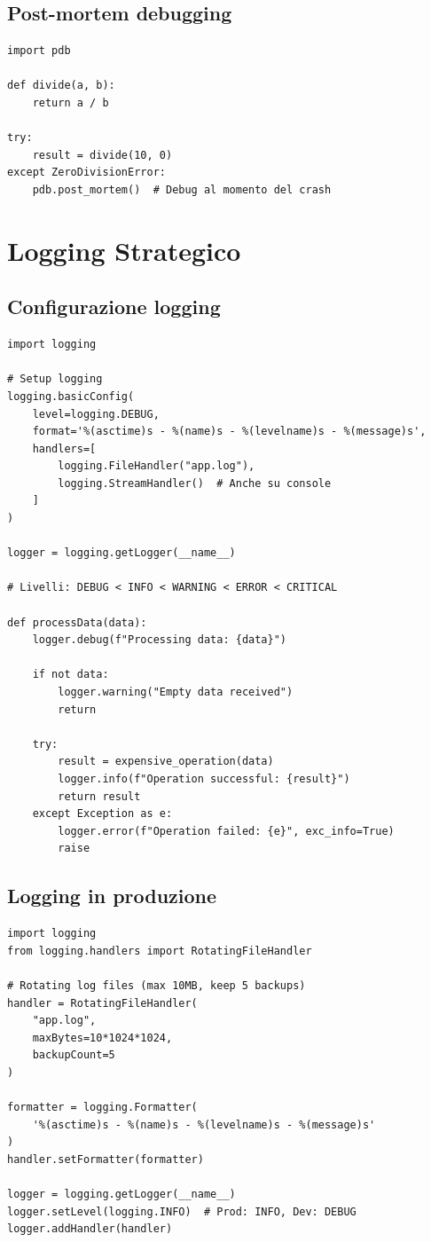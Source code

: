 \subsection{Post-mortem debugging}

\begin{lstlisting}
import pdb

def divide(a, b):
    return a / b

try:
    result = divide(10, 0)
except ZeroDivisionError:
    pdb.post_mortem()  # Debug al momento del crash
\end{lstlisting}

\section{Logging Strategico}

\subsection{Configurazione logging}

\begin{lstlisting}
import logging

# Setup logging
logging.basicConfig(
    level=logging.DEBUG,
    format='%(asctime)s - %(name)s - %(levelname)s - %(message)s',
    handlers=[
        logging.FileHandler("app.log"),
        logging.StreamHandler()  # Anche su console
    ]
)

logger = logging.getLogger(__name__)

# Livelli: DEBUG < INFO < WARNING < ERROR < CRITICAL

def processData(data):
    logger.debug(f"Processing data: {data}")

    if not data:
        logger.warning("Empty data received")
        return

    try:
        result = expensive_operation(data)
        logger.info(f"Operation successful: {result}")
        return result
    except Exception as e:
        logger.error(f"Operation failed: {e}", exc_info=True)
        raise
\end{lstlisting}

\subsection{Logging in produzione}

\begin{lstlisting}
import logging
from logging.handlers import RotatingFileHandler

# Rotating log files (max 10MB, keep 5 backups)
handler = RotatingFileHandler(
    "app.log",
    maxBytes=10*1024*1024,
    backupCount=5
)

formatter = logging.Formatter(
    '%(asctime)s - %(name)s - %(levelname)s - %(message)s'
)
handler.setFormatter(formatter)

logger = logging.getLogger(__name__)
logger.setLevel(logging.INFO)  # Prod: INFO, Dev: DEBUG
logger.addHandler(handler)
\end{lstlisting}

